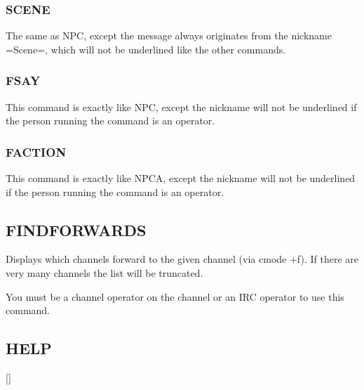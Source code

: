 \subsubsection{SCENE}
	 \literal{:} 

	The same as NPC, except the message always originates from the
	nickname =Scene=, which will not be underlined like the other commands.

\subsubsection{FSAY}
   \literal{:} 

	This command is exactly like NPC, except the nickname will not be
	underlined if the person running the command is an operator.


\subsubsection{FACTION}
   \literal{:} 

	This command is exactly like NPCA, except the nickname will not be
	underlined if the person running the command is an operator.


\subsection{FINDFORWARDS}

 
	Displays which channels forward to the given channel (via cmode +f). If
	there are very many channels the list will be truncated.

	You must be a channel operator on the channel or an IRC operator to use
	this command.


\subsection{HELP}
	 []

